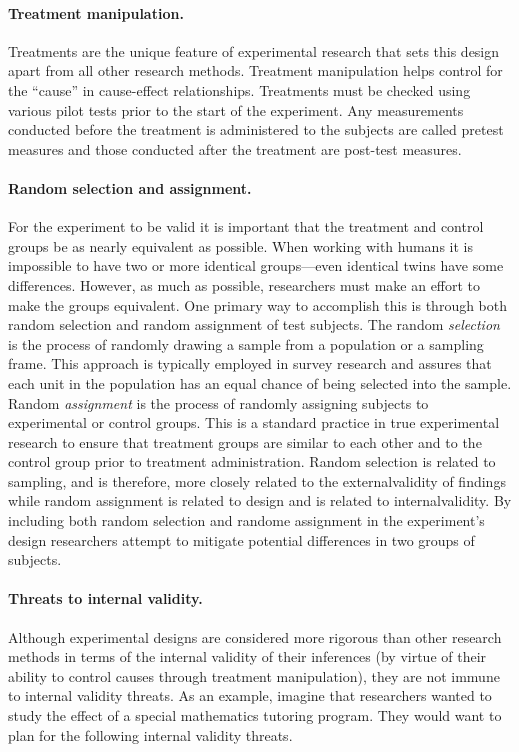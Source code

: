 \paragraph{Treatment manipulation.} Treatments are the unique feature of experimental research that sets this design apart from all other research methods. Treatment manipulation helps control for the ``cause'' in cause-effect relationships. Treatments must be checked using various pilot tests prior to the start of the experiment. Any measurements conducted before the treatment is administered to the subjects are called pretest measures and those conducted after the treatment are post-test measures. 

\paragraph{Random selection and assignment.} For the experiment to be valid it is important that the treatment and control groups be as nearly equivalent as possible. When working with humans it is impossible to have two or more identical groups---even identical twins have some differences. However, as much as possible, researchers must make an effort to make the groups equivalent. One primary way to accomplish this is through both random selection and random assignment of test subjects. The random \textit{selection} is the process of randomly drawing a sample from a population or a sampling frame. This approach is typically employed in survey research and assures that each unit in the population has an equal chance of being selected into the sample. Random \textit{assignment} is the process of randomly assigning subjects to experimental or control groups. This is a standard practice in true experimental research to ensure that treatment groups are similar to each other and to the control group prior to treatment administration. Random selection is related to sampling, and is therefore, more closely related to the \gls{externalvalidity} of findings while random assignment is related to design and is related to \gls{internalvalidity}. By including both random selection and randome assignment in the experiment's design researchers attempt to mitigate potential differences in two groups of subjects.

\paragraph{Threats to internal validity.} Although experimental designs are considered more rigorous than other research methods in terms of the internal validity of their inferences (by virtue of their ability to control causes through treatment manipulation), they are not immune to internal validity threats. As an example, imagine that researchers wanted to study the effect of a special mathematics tutoring program. They would want to plan for the following internal validity threats.

